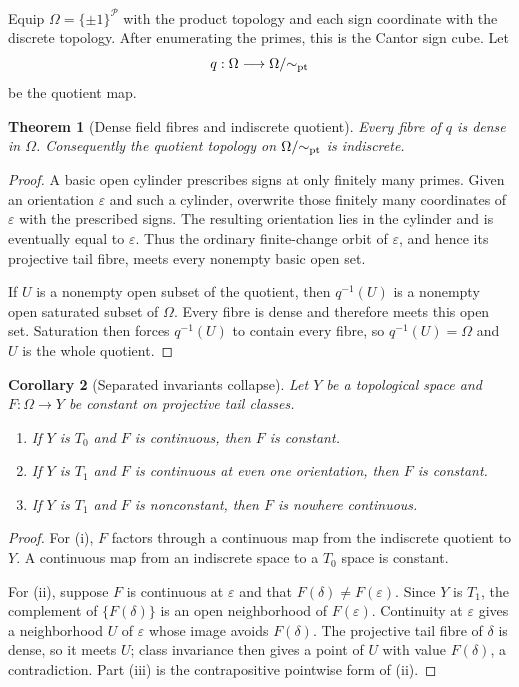 \documentclass[11pt]{article}
\newtheorem{theorem}{Theorem}[section]
\newtheorem{corollary}[theorem]{Corollary}
\theoremstyle{definition}
\theoremstyle{remark}
\newcommand{\cP}{\mathcal P}
\begin{document}
Equip \(\Omega=\{\pm1\}^{\cP}\) with the product topology and each sign coordinate with the
discrete topology.  After enumerating the primes, this is the Cantor sign cube.  Let
\[
  q:\Omega\longrightarrow\Omega/{\sim_{\rm pt}}
\]
be the quotient map.

\begin{theorem}[Dense field fibres and indiscrete quotient]\label{thm:indiscrete}
Every fibre of \(q\) is dense in \(\Omega\).  Consequently the quotient topology on
\(\Omega/{\sim_{\rm pt}}\) is indiscrete.
\end{theorem}

\begin{proof}
A basic open cylinder prescribes signs at only finitely many primes.  Given an orientation
\(\varepsilon\) and such a cylinder, overwrite those finitely many coordinates of
\(\varepsilon\) with the prescribed signs.  The resulting orientation lies in the cylinder and
is eventually equal to \(\varepsilon\).  Thus the ordinary finite-change orbit of
\(\varepsilon\), and hence its projective tail fibre, meets every nonempty basic open set.

If \(U\) is a nonempty open subset of the quotient, then \(q^{-1}(U)\) is a nonempty open
saturated subset of \(\Omega\).  Every fibre is dense and therefore meets this open set.
Saturation then forces \(q^{-1}(U)\) to contain every fibre, so \(q^{-1}(U)=\Omega\) and \(U\)
is the whole quotient.
\end{proof}

\begin{corollary}[Separated invariants collapse]\label{cor:continuous-collapse}
Let \(Y\) be a topological space and \(F:\Omega\to Y\) be constant on projective tail
classes.
\begin{enumerate}[label=\textup{(\roman*)},leftmargin=2.2em]
  \item If \(Y\) is \(T_0\) and \(F\) is continuous, then \(F\) is constant.
  \item If \(Y\) is \(T_1\) and \(F\) is continuous at even one orientation, then
  \(F\) is constant.
  \item If \(Y\) is \(T_1\) and \(F\) is nonconstant, then \(F\) is nowhere
  continuous.
\end{enumerate}
\end{corollary}

\begin{proof}
For (i), \(F\) factors through a continuous map from the indiscrete quotient to \(Y\).  A
continuous map from an indiscrete space to a \(T_0\) space is constant.

For (ii), suppose \(F\) is continuous at \(\varepsilon\) and that
\(F(\delta)\neq F(\varepsilon)\).  Since \(Y\) is \(T_1\), the complement of
\(\{F(\delta)\}\) is an open neighborhood of \(F(\varepsilon)\).  Continuity at
\(\varepsilon\) gives a neighborhood \(U\) of \(\varepsilon\) whose image avoids
\(F(\delta)\).  The projective tail fibre of \(\delta\) is dense, so it meets \(U\); class
invariance then gives a point of \(U\) with value \(F(\delta)\), a contradiction.  Part (iii)
is the contrapositive pointwise form of (ii).
\end{proof}
\end{document}
